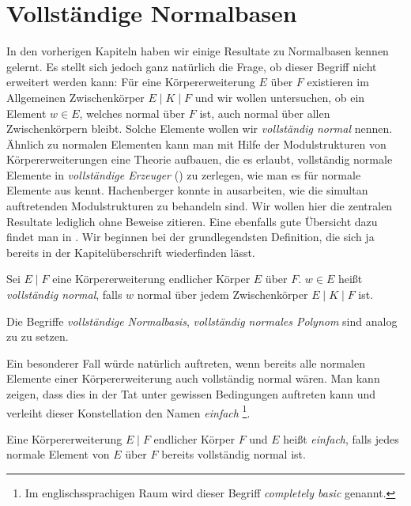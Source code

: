 \chapter{Vollständige Normalbasen}
\label{chap:vollst_normalbasen}

In den vorherigen Kapiteln haben wir einige Resultate zu Normalbasen kennen
gelernt. Es stellt sich jedoch ganz natürlich die Frage, ob dieser Begriff
nicht erweitert werden kann: Für eine Körpererweiterung $E$ über $F$ existieren
im Allgemeinen Zwischenkörper $E \mid K \mid F$ und wir wollen untersuchen,
ob ein Element $w \in E$, welches normal über $F$ ist, auch normal über allen
Zwischenkörpern bleibt. Solche Elemente wollen wir \emph{vollständig normal}
nennen. Ähnlich zu normalen Elementen kann man mit Hilfe der Modulstrukturen
von Körpererweiterungen eine Theorie aufbauen, die es erlaubt, vollständig
normale Elemente in \emph{vollständige Erzeuger} () zu
zerlegen, wie man es für normale Elemente aus 
kennt. Hachenberger konnte in \autocite{hachenberger1997finite} ausarbeiten, wie
die simultan auftretenden Modulstrukturen zu behandeln sind. Wir wollen hier
die zentralen Resultate lediglich ohne Beweise zitieren. Eine ebenfalls gute
Übersicht dazu findet man in \autocite{hachenberger2013handbook}.
Wir beginnen bei der grundlegendsten Definition, die sich ja bereits in der
Kapitelüberschrift wiederfinden lässt.

\begin{definition}
  \label{def:vollst_normal}
  Sei $E \mid F$ eine Körpererweiterung endlicher Körper $E$ über $F$.
  $w\in E$ heißt \emph{vollständig normal}, falls $w$ normal über jedem
  Zwischenkörper $E \mid K\mid F$ ist.

  Die Begriffe \emph{vollständige Normalbasis}, \emph{vollständig normales
  Polynom} sind analog zu  zu setzen.
\end{definition}

Ein besonderer Fall würde natürlich auftreten, wenn bereits alle normalen
Elemente einer Körpererweiterung auch vollständig normal wären. Man kann zeigen,
dass dies in der Tat unter gewissen Bedingungen auftreten kann und verleiht
dieser Konstellation den Namen \emph{einfach}%
\footnote{Im englischssprachigen Raum wird
dieser Begriff \emph{completely basic} genannt.}.

\begin{definition}[einfach]
  \label{def:einfach}
  Eine Körpererweiterung $E \mid F$ endlicher Körper $F$ und $E$ heißt 
  \emph{einfach}, falls jedes normale Element von $E$ über $F$ bereits
  vollständig normal ist.
\end{definition}


